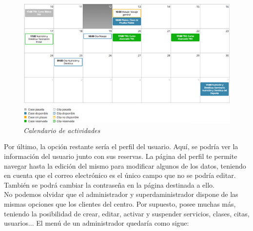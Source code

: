 \begin{figure}
\centering
  \includegraphics[scale=.60]{img/manual/calendario.jpg}
  \caption{\textit{Calendario de actividades}}
  \label{fig:calendario}
\end{figure}

Por último, la opción restante sería el perfil del usuario. Aquí, se podría ver la información del usuario junto con sus reservas. La página del perfil te permite navegar hasta la edición del mismo para modificar algunos de los datos, teniendo en cuenta que el correo electrónico es el único campo que no se podría editar. También se podrá cambiar la contraseña en la página destinada a ello.\\

No podemos olvidar que el administrador y superdaministrador dispone de las mismas opciones que los clientes del centro. Por supuesto, posee muchas más, teniendo la posibilidad de crear, editar, activar y suspender servicios, clases, citas, usuarios... El menú de un administrador quedaría como sigue:


